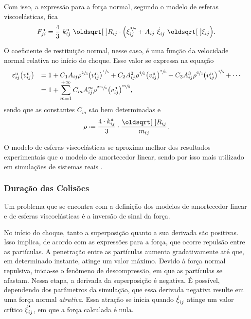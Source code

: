 Com isso, a expressão para a força normal, segundo o modelo de esferas viscoelásticas, fica
\begin{equation*}
	\normalForceScalarji = \dfrac{4}{3}\ \effectiveNormalElasticij\ \sqrt{\effectiveRadiusij}\cdot\pqty{
		\overlapij^{\sfrac{3}{2}} + \normalDissipativeConstantij\ \overlapDerivativeij\ \sqrt{\overlapij}
	}.
\end{equation*}

O coeficiente de restituição normal, nesse caso, é uma função da velocidade normal relativa no início do choque. Esse valor se expressa na equação
\begin{equation*}
	\begin{array}{rl}
	\normalCoefficientOfRestitutionij\pqty{\beforeCollision{\relativeNormalVelocityScalarij}} & = 
	1
	+ C_1 \normalDissipativeConstantij\rho^{\sfrac{2}{5}}\pqty{\relativeNormalVelocityScalarij}^{\sfrac{1}{5}}
	+ C_2 \normalDissipativeConstantij^2 \rho^{\sfrac{4}{5}}\pqty{\relativeNormalVelocityScalarij}^{\sfrac{2}{5}}
	+ C_3 \normalDissipativeConstantij^3 \rho^{\sfrac{6}{5}}\pqty{\relativeNormalVelocityScalarij}^{\sfrac{3}{5}}
	+ \dotsb \\
	& \displaystyle = 1 + \sum_{m=1}^{+\infty} C_m \normalDissipativeConstantij^m \rho^{\sfrac{2m}{5}}\pqty{\relativeNormalVelocityScalarij}^{\sfrac{m}{5}},
	\end{array}
\end{equation*}
sendo que as constantes \(C_m\) são bem determinadas \cite[p. 143]{bib:computational_granular_dynamics} e
\begin{equation*}
	\rho \eqdef \dfrac{4\cdot\effectiveNormalElasticij}{3}\cdot\dfrac{\sqrt{\effectiveRadiusij}}{\massij}.
\end{equation*}

O modelo de esferas viscoelásticas se aproxima melhor dos resultados experimentais que o modelo de amortecedor linear, sendo por isso mais utilizado em simulações de sistemas reais \cite[p. 143]{bib:computational_granular_dynamics}.

\subsubsection*{Duração das Colisões}

Um problema que se encontra com a definição dos modelos de amortecedor linear e de esferas viscoelásticas é a inversão de sinal da força.

No início do choque, tanto a superposição quanto a sua derivada são positivas. Isso implica, de acordo com as expressões para a força, que ocorre repulsão entre as partículas. A penetração entre as partículas aumenta gradativamente até que, em determinado instante, atinge um valor máximo. Devido à força normal repulsiva, inicia-se o fenômeno de descompressão, em que as partículas se afastam. Nessa etapa, a derivada da superposição é negativa. É possível, dependendo dos parâmetros da simulação, que essa derivada negativa resulte em uma força normal \textit{atrativa}. Essa atração se inicia quando \(\overlapDerivativeij\) atinge um valor crítico \(\principal{\overlapDerivativeij}\), em que a força calculada é nula.

